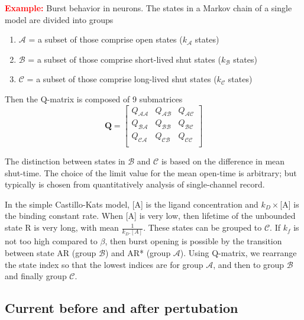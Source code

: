 \textcolor{red}{\bf Example:} Burst behavior in neurons. The states in a Markov
chain of a single model are divided into groups
\begin{enumerate}
  \item $\mathcal{A}$ = a subset of those comprise open states ($k_\mathcal{A}$
  states)
  \item $\mathcal{B}$ = a subset of those comprise short-lived shut states
  ($k_\mathcal{B}$ states)
  \item $\mathcal{C}$ = a subset of those comprise long-lived shut states
  ($k_\mathcal{C}$ states)
\end{enumerate}
Then the Q-matrix is composed of 9 submatrices
\begin{equation}
\mathbf{Q} = \left[ \begin{array}{ccc}
Q_{\mathcal{AA}} & Q_{\mathcal{AB}} & Q_{\mathcal{AC}} \\
Q_{\mathcal{BA}} & Q_{\mathcal{BB}} & Q_{\mathcal{BC}} \\
Q_{\mathcal{CA}} & Q_{\mathcal{CB}} & Q_{\mathcal{CC}} \\
\end{array} \right]
\end{equation}

The distinction between states in $\mathcal{B}$ and $\mathcal{C}$ is based on
the difference in mean shut-time. The choice of the limit value for the mean
open-time is arbitrary; but typically is chosen from quantitatively analysis of
single-channel record.

In the simple Castillo-Kats model, [A] is the ligand concentration and
$k_D\times $[A] is the binding constant rate. When [A] is very low, then
lifetime of the unbounded state R is very long, with mean $\frac{1}{k_D.[A]}$.
These states can be grouped to $\mathcal{C}$. If $k_f$ is not too high compared
to $\beta$, then burst opening is possible by the transition between state AR
(group $\mathcal{B}$) and AR* (group $\mathcal{A}$). Using Q-matrix, we
rearrange the state index so that the lowest indices are for group
$\mathcal{A}$, and then to group $\mathcal{B}$ and finally group $\mathcal{C}$.


\subsection{Current before and after pertubation}
\label{sec:non_constant_Q}

